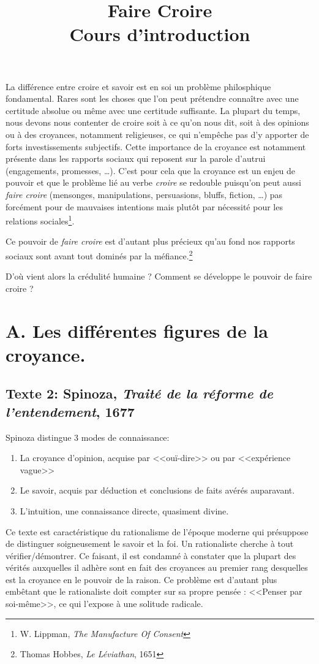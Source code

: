 \documentclass[12pt]{article}
\title{Faire Croire\\\large Cours d'introduction}
\date{}
\author{}
\begin{document}
\maketitle
\thispagestyle{fancy}


La différence entre croire et savoir est en soi un problème philosphique fondamental.
Rares sont les choses que l'on peut prétendre connaître avec une certitude absolue ou même avec une certitude suffisante.
La plupart du temps, nous devons nous contenter de croire soit à ce qu'on nous dit, soit à des opinions ou à des croyances, notamment religieuses, ce qui n'empêche pas d'y apporter de forts investissements subjectifs.
Cette importance de la croyance est notamment présente dans les rapports sociaux qui reposent sur la parole d'autrui (engagements, promesses, \dots).
C'est pour cela que la croyance est un enjeu de pouvoir et que le problème lié au verbe \emph{croire} se redouble puisqu'on peut aussi \emph{faire croire} (mensonges, manipulations, persuasions, bluffs, fiction, \dots) pas forcément pour de mauvaises intentions mais plutôt par nécessité pour les relations sociales\footnote{W. Lippman, \emph{The Manufacture Of Consent}}.\par
Ce pouvoir de \emph{faire croire} est d'autant plus précieux qu'au fond nos rapports sociaux sont avant tout dominés par la méfiance.\footnote{Thomas Hobbes, \emph{Le Léviathan}, 1651}\par
D'où vient alors la crédulité humaine ? Comment se développe le pouvoir de faire croire ?
\section*{\color{red}A. Les différentes figures de la croyance.}
\subsection*{Texte 2: Spinoza, \emph{Traité de la réforme de l'entendement}, 1677}
Spinoza distingue 3 modes de connaissance:
\begin{enumerate}
    \item La croyance d'opinion, acquise par <<ouï-dire>> ou par <<expérience vague>>
    \item Le savoir, acquis par déduction et conclusions de faits avérés auparavant.
    \item L'intuition, une connaissance directe, quasiment divine.
\end{enumerate}
\par
Ce texte est caractéristique du rationalisme de l'époque moderne qui présuppose de distinguer soigneusement le savoir et la foi.
Un rationaliste cherche à tout vérifier/démontrer.
Ce faisant, il est condamné à constater que la plupart des vérités auxquelles il adhère sont en fait des croyances au premier rang desquelles est la croyance en le pouvoir de la raison.
Ce problème est d'autant plus embêtant que le rationaliste doit compter sur sa propre pensée : <<Penser par soi-même>>, ce qui l'expose à une solitude radicale.\par 
\pagebreak
\end{document}
